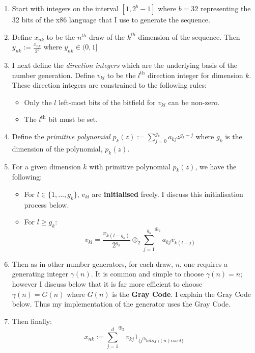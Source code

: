 \documentclass{report}
\theoremstyle{plain}
\theoremstyle{definition}
\begin{document}
\begin{enumerate}
	\item Start with integers on the interval $[1,2^b-1]$ where $b=32$ representing the 32 bits of the x86 language that I use to generate the sequence. 
	\item Define $x_{nk}$ to be the $n^{th}$ draw of the $k^{th}$ dimension of the sequence. Then $y_{nk} := \frac{x_{nk}}{2^b}$ where $y_{nk} \in (0,1]$
	\item I next define the \emph{direction integers} which are the underlying basis of the number generation. Define $v_{kl}$ to be the $l^{\text{th}}$ direction integer for dimension $k$. These direction integers are constrained to the following rules: 
	\begin{itemize}
		\item Only the $l$ left-most bits of the bitfield for $v_{kl}$ can be non-zero.
		\item The $l^{\text{th}}$ bit must be set.
	\end{itemize}
	\item Define the \textit{primitive polynomial} $p_k(z) := \sum_{j=0}^{g_k} a_{kj}z^{g_k-j}$ where $g_k$ is the dimension of the polynomial, $p_k(z)$.
	\item For a given dimension $k$ with primitive polynomial $p_k(z)$, we have the following: 
	\begin{itemize}
		\item For $l \in \{1,...,g_k\}$, $v_{kl}$ are \textbf{initialised} freely. I discuss this initialisation process below.
		\item For $l\ge g_k$: $$v_{kl} = \frac{v_{k(l-g_k)}}{2^{g_k}} \oplus_2 {\sum_{j=1}^{g_k}}^{\oplus_2} a_{kj}v_{k(l-j)}$$
	\end{itemize}
	\item Then as in other number generators, for each draw, $n$, one requires a generating integer $\gamma(n)$. It is common and simple to choose $\gamma(n) = n$; however I discuss below that it is far more efficient to choose $\gamma(n) = G(n)$ where $G(n)$ is the \textbf{Gray Code}. I explain the Gray Code below. Thus my implementation of the generator uses the Gray Code.
	\item Then finally: 
	\begin{equation}
	\label{soboleqn}
	x_{nk} := {\sum_{j=1}^{d}}^{\oplus_2} v_{kj}\mathcal{1}_{\{j^{th} bit of \gamma(n) is set\}}
	\end{equation}
\end{enumerate}
\end{document}

